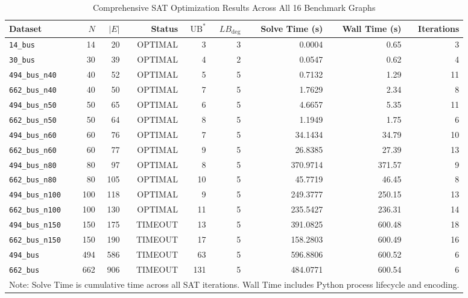 \documentclass[a4paper,fleqn]{cas-sc}
\begin{document}
\begin{table}
\centering
\caption{Comprehensive SAT Optimization Results Across All 16 Benchmark Graphs}
\label{tab:table_per_dataset}
\begin{tabular}{lrrrrrrrr}
\toprule
Dataset & $N$ & $|E|$ & Status & $\text{UB}^*$ & $LB_{\text{deg}}$ & Solve Time (s) & Wall Time (s) & Iterations \\
\midrule
\texttt{14\_bus} & 14 & 20 & OPTIMAL & 3 & 3 & 0.0004 & 0.65 & 3 \\
\texttt{30\_bus} & 30 & 39 & OPTIMAL & 4 & 2 & 0.0547 & 0.62 & 4 \\
\texttt{494\_bus\_n40} & 40 & 52 & OPTIMAL & 5 & 5 & 0.7132 & 1.29 & 11 \\
\texttt{662\_bus\_n40} & 40 & 50 & OPTIMAL & 7 & 5 & 1.7629 & 2.34 & 8 \\
\texttt{494\_bus\_n50} & 50 & 65 & OPTIMAL & 6 & 5 & 4.6657 & 5.35 & 11 \\
\texttt{662\_bus\_n50} & 50 & 64 & OPTIMAL & 8 & 5 & 1.1949 & 1.75 & 6 \\
\texttt{494\_bus\_n60} & 60 & 76 & OPTIMAL & 7 & 5 & 34.1434 & 34.79 & 10 \\
\texttt{662\_bus\_n60} & 60 & 77 & OPTIMAL & 9 & 5 & 26.8385 & 27.39 & 13 \\
\texttt{494\_bus\_n80} & 80 & 97 & OPTIMAL & 8 & 5 & 370.9714 & 371.57 & 9 \\
\texttt{662\_bus\_n80} & 80 & 105 & OPTIMAL & 10 & 5 & 45.7719 & 46.45 & 8 \\
\texttt{494\_bus\_n100} & 100 & 118 & OPTIMAL & 9 & 5 & 249.3777 & 250.15 & 13 \\
\texttt{662\_bus\_n100} & 100 & 130 & OPTIMAL & 11 & 5 & 235.5427 & 236.31 & 14 \\
\texttt{494\_bus\_n150} & 150 & 175 & TIMEOUT & 13 & 5 & 391.0825 & 600.48 & 18 \\
\texttt{662\_bus\_n150} & 150 & 190 & TIMEOUT & 17 & 5 & 158.2803 & 600.49 & 16 \\
\texttt{494\_bus} & 494 & 586 & TIMEOUT & 63 & 5 & 596.8806 & 600.52 & 6 \\
\texttt{662\_bus} & 662 & 906 & TIMEOUT & 131 & 5 & 484.0771 & 600.54 & 6 \\
\bottomrule
\multicolumn{9}{l}{\footnotesize Note: Solve Time is cumulative time across all SAT iterations. Wall Time includes Python process lifecycle and encoding.} \\
\end{tabular}
\end{table}
\end{document}
